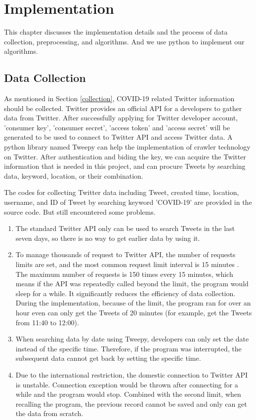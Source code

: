 \chapter{Implementation}
\label{ch:implementation}

This chapter discusses the implementation details and the process of data collection, preprocessing, and algorithms. And we use python to implement our algorithms.

\section{Data Collection}
As mentioned in Section \ref{collection}, COVID-19 related Twitter information should be collected. Twitter provides an official API for a developers to gather data from Twitter. After successfully applying for Twitter developer account, 'consumer key', 'consumer secret', 'access token' and 'access secret' will be generated to be used to connect to Twitter API and access Twitter data. A python library named Tweepy can help the implementation of crawler technology on Twitter. After authentication and biding the key, we can acquire the Twitter information that is needed in this project, and can procure Tweets by searching data, keyword, location, or their combination.

The codes for collecting Twitter data including Tweet, created time, location, username, and ID of Tweet by searching keyword 'COVID-19' are provided in the source code. But still encountered some problems.

\begin{enumerate}
    \item The standard Twitter API only can be used to search Tweets in the last seven days, so there is no way to get earlier data by using it.
    
    \item To manage thousands of request to Twitter API, the number of requests limits are set, and the most common request limit interval is 15 minutes \cite{rate-limits}. The maximum number of requests is 150 times every 15 minutes, which means if the API was repeatedly called beyond the limit, the program would sleep for a while. It significantly reduces the efficiency of data collection. During the implementation, because of the limit, the program ran for over an hour even can only get the Tweets of 20 minutes (for example, get the Tweets from 11:40 to 12:00).
    
    \item When searching data by date using Tweepy, developers can only set the date instead of the specific time. Therefore, if the program was interrupted, the subsequent data cannot get back by setting the specific time.
    
    \item Due to the international restriction, the domestic connection to Twitter API is unstable. Connection exception would be thrown after connecting for a while and the program would stop. Combined with the second limit, when recalling the program, the previous record cannot be saved and only can get the data from scratch. 
\end{enumerate}

